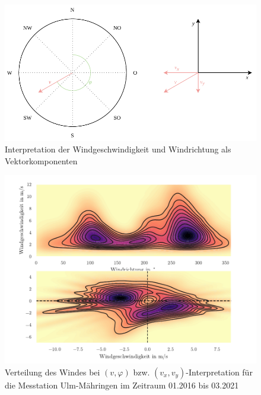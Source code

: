 \documentclass[
12pt, %
toc=listofnumbered, %
toc=chapterentrydotfill, %
numbers=noenddot, %
captions=tableheading, %
]{scrreprt}
\begin{document}
\begin{figure}[tph]
	\begin{center}
		\includegraphics[scale = 1]{./images/pol2cart.pdf}
		\caption{Interpretation der Windgeschwindigkeit und Windrichtung als Vektorkomponenten}
		\label{fig:pol2cart}
	\end{center}
\end{figure}

\begin{figure}[tph]
	\begin{center}
		\includegraphics[scale = 1]{./images/pol2cart_visualize.pdf}
		\caption{Verteilung des Windes bei $(v,\varphi)$ bzw. $(v_x,v_y)$-Interpretation für die Messtation Ulm-Mähringen im Zeitraum 01.2016 bis 03.2021}
		\label{fig:pol2cart2}
	\end{center}
\end{figure}
\end{document}

